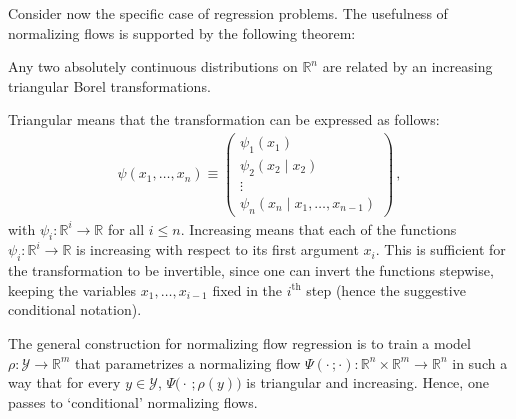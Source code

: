     Consider now the specific case of regression problems. The usefulness of normalizing flows is supported by the following theorem:
    \begin{theorem}
        Any two absolutely continuous distributions on $\mathbb{R}^n$ are related by an increasing triangular Borel transformations.
    \end{theorem}
    Triangular means that the transformation can be expressed as follows:
    \begin{gather}
        \psi(x_1,\ldots,x_n)\equiv
        \begin{pmatrix}
            \psi_1(x_1)\\
            \psi_2(x_2\mid x_2)\\
            \vdots\\
            \psi_n(x_n\mid x_1,\ldots,x_{n-1})
        \end{pmatrix}\,,
    \end{gather}
    with $\psi_i:\mathbb{R}^i\rightarrow\mathbb{R}$ for all $i\leq n$. Increasing means that each of the functions $\psi_i:\mathbb{R}^i\rightarrow\mathbb{R}$ is increasing with respect to its first argument $x_i$. This is sufficient for the transformation to be invertible, since one can invert the functions stepwise, keeping the variables $x_1,\ldots,x_{i-1}$ fixed in the $i^{\text{th}}$ step (hence the suggestive conditional notation).

    The general construction for normalizing flow regression is to train a model $\rho:\mathcal{Y}\rightarrow\mathbb{R}^m$ that parametrizes a normalizing flow $\Psi(\cdot\,;\cdot):\mathbb{R}^n\times\mathbb{R}^m\rightarrow\mathbb{R}^n$ in such a way that for every $y\in\mathcal{Y}$, $\Psi\bigl(\cdot\,;\rho(y)\bigr)$ is triangular and increasing. Hence, one passes to `conditional' normalizing flows.

